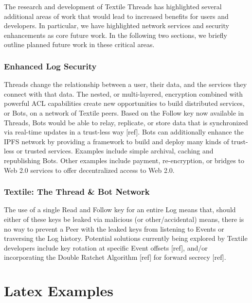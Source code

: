 \documentclass{comjnl}
\begin{document}
The research and development of Textile Threads has highlighted several additional areas of work that would lead to increased benefits for users and developers. In particular, we have highlighted network services and security enhancements as core future work. In the following two sections, we briefly outline planned future work in these critical areas.

\subsubsection{Enhanced Log Security}

Threads change the relationship between a user, their data, and the services they connect with that data. The nested, or multi-layered, encryption combined with powerful ACL capabilities create new opportunities to build distributed services, or Bots, on a network of Textile peers. Based on the Follow key now available in Threads, Bots would be able to relay, replicate, or store data that is synchronized via real-time updates in a trust-less way [ref]. Bots can additionally enhance the IPFS network by providing a framework to build and deploy many kinds of trust-less or trusted services. Examples include simple archival, caching and republishing Bots. Other examples include payment, re-encryption, or bridges to Web 2.0 services to offer decentralized access to Web 2.0.

\subsubsection{Textile: The Thread \& Bot Network}

The use of a single Read and Follow key for an entire Log means that, should either of these keys be leaked via malicious (or other/accidental) means, there is no way to prevent a Peer with the leaked keys from listening to Events or traversing the Log history. Potential solutions currently being explored by Textile developers include key rotation at specific Event offsets [ref], and/or incorporating the Double Ratchet Algorithm [ref] for forward secrecy [ref].

\section{Latex Examples}
\end{document}
